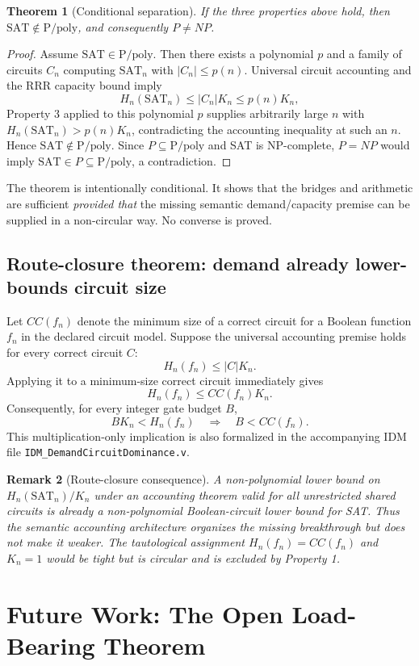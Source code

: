 \documentclass[11pt]{article}
\newtheorem{theorem}{Theorem}[section]
\newtheorem{remark}[theorem]{Remark}
\newcommand{\SAT}{\mathrm{SAT}}
\newcommand{\Ppoly}{\mathrm{P}/\mathrm{poly}}
\begin{document}
\begin{theorem}[Conditional separation]
If the three properties above hold, then $\SAT\notin\Ppoly$, and consequently $P\neq NP$.
\end{theorem}
\begin{proof}
Assume $\SAT\in\Ppoly$. Then there exists a polynomial $p$ and a family of circuits $C_n$ computing $\SAT_n$ with $|C_n|\le p(n)$. Universal circuit accounting and the RRR capacity bound imply
\[
H_n(\SAT_n)\le |C_n|K_n\le p(n)K_n,
\]
Property 3 applied to this polynomial $p$ supplies arbitrarily large $n$ with $H_n(\SAT_n)>p(n)K_n$, contradicting the accounting inequality at such an $n$. Hence $\SAT\notin\Ppoly$. Since $P\subseteq\Ppoly$ and SAT is NP-complete, $P=NP$ would imply $\SAT\in P\subseteq\Ppoly$, a contradiction.
\end{proof}

The theorem is intentionally conditional. It shows that the bridges and arithmetic are sufficient \emph{provided that} the missing semantic demand/capacity premise can be supplied in a non-circular way. No converse is proved.

\subsection{Route-closure theorem: demand already lower-bounds circuit size}
Let $CC(f_n)$ denote the minimum size of a correct circuit for a Boolean function $f_n$ in the declared circuit model. Suppose the universal accounting premise holds for every correct circuit $C$:
\[
H_n(f_n)\le |C|K_n.
\]
Applying it to a minimum-size correct circuit immediately gives
\[
\boxed{H_n(f_n)\le CC(f_n)K_n.}
\]
Consequently, for every integer gate budget $B$,
\[
BK_n<H_n(f_n)\quad\Longrightarrow\quad B<CC(f_n).
\]
This multiplication-only implication is also formalized in the accompanying IDM file \texttt{IDM\_DemandCircuitDominance.v}.

\begin{remark}[Route-closure consequence]
A non-polynomial lower bound on $H_n(\SAT_n)/K_n$ under an accounting theorem valid for all unrestricted shared circuits is already a non-polynomial Boolean-circuit lower bound for SAT. Thus the semantic accounting architecture organizes the missing breakthrough but does not make it weaker. The tautological assignment $H_n(f_n)=CC(f_n)$ and $K_n=1$ would be tight but is circular and is excluded by Property 1.
\end{remark}

\section{Future Work: The Open Load-Bearing Theorem}
\label{sec:future}
\end{document}

